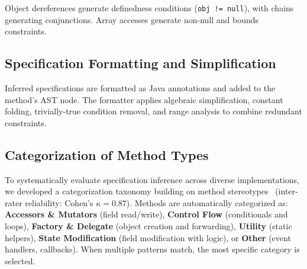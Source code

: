 Object dereferences generate definedness conditions (\texttt{obj != null}), with chains generating conjunctions. Array accesses generate non-null and bounds constraints.

\subsection{Specification Formatting and Simplification}

Inferred specifications are formatted as Java annotations and added to the method's AST node. The formatter applies algebraic simplification, constant folding, trivially-true condition removal, and range analysis to combine redundant constraints.

\subsection{Categorization of Method Types}
\label{subsec:categorization}

To systematically evaluate specification inference across diverse implementations, we developed a categorization taxonomy building on method stereotypes~\cite{dragan2006reverse} (inter-rater reliability: Cohen's $\kappa = 0.87$). Methods are automatically categorized as: \textbf{Accessors \& Mutators} (field read/write), \textbf{Control Flow} (conditionals and loops), \textbf{Factory \& Delegate} (object creation and forwarding), \textbf{Utility} (static helpers), \textbf{State Modification} (field modification with logic), or \textbf{Other} (event handlers, callbacks). When multiple patterns match, the most specific category is selected.
